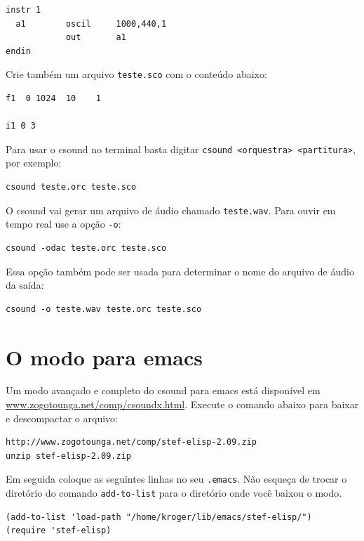 \documentclass[12pt,brazil]{book}
\begin{document}
\begin{verbatim}
instr 1
  a1        oscil     1000,440,1
            out       a1       
endin
\end{verbatim}

Crie também um arquivo \texttt{teste.sco} com o conteúdo abaixo:

\begin{verbatim}
f1  0 1024  10    1

i1 0 3
\end{verbatim}

Para usar o csound no terminal basta digitar \texttt{csound
  <orquestra> <partitura>}, por exemplo:

\begin{verbatim}
csound teste.orc teste.sco
\end{verbatim}

O csound vai gerar um arquivo de áudio chamado \texttt{teste.wav}.
Para ouvir em tempo real use a opção \texttt{-o}:

\begin{verbatim}
csound -odac teste.orc teste.sco
\end{verbatim}

Essa opção também pode ser usada para determinar o nome do arquivo de
áudio da saída:

\begin{verbatim}
csound -o teste.wav teste.orc teste.sco
\end{verbatim}

\section{O modo para emacs}
\label{sec:o-modo-para}

Um modo avançado e completo do csound para emacs está disponível em
\url{www.zogotounga.net/comp/csoundx.html}. Execute o comando abaixo
para baixar e descompactar o arquivo:

\begin{verbatim}
http://www.zogotounga.net/comp/stef-elisp-2.09.zip
unzip stef-elisp-2.09.zip
\end{verbatim}

Em seguida coloque as seguintes linhas no seu \texttt{.emacs}. Não
esqueça de trocar o diretório do comando \texttt{add-to-list} para o
diretório onde você baixou o modo.

\begin{verbatim}
(add-to-list 'load-path "/home/kroger/lib/emacs/stef-elisp/")
(require 'stef-elisp)
\end{verbatim}
\end{document}
